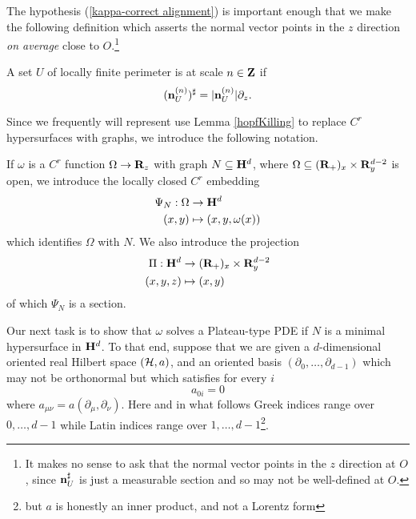 The hypothesis (\ref{kappa-correct alignment}) is important enough that we make the following definition which asserts the normal vector points in the $z$ direction \emph{on average} close to $O$.\footnote{It makes no sense to ask that the normal vector points in the $z$ direction at $O$, since $\mathbf n^\sharp_U$ is just a measurable section and so may not be well-defined at $O$.}

\begin{definition}
A set $U$ of locally finite perimeter is  at scale $n \in \mathbf{Z}$ if 
$$(\mathbf n^{(n)}_U)^\sharp = |\mathbf n^{(n)}_U|\partial_z.$$
\end{definition}

Since we frequently will represent use Lemma \ref{hopfKilling} to replace $C^r$ hypersurfaces with graphs, we introduce the following notation.

\begin{notation}\label{hyperbolic line bundle}
    If $\omega$ is a $C^r$ function $\Omega \to \mathbf{R}_z$ with graph $N \subseteq \mathbf H^d$, where $\Omega \subseteq (\mathbf{R}_+)_x \times \mathbf{R}^{d - 2}_y$ is open, we introduce the locally closed $C^r$ embedding
    \begin{align*}
        \Psi_N: \Omega &\to \mathbf H^d \\
        (x, y) &\mapsto (x, y, \omega(x))
    \end{align*}
    which identifies $\Omega$ with $N$.
    We also introduce the projection
    \begin{align*}
        \Pi: \mathbf H^d &\to (\mathbf{R}_+)_x \times \mathbf{R}^{d - 2}_y\\
        (x, y, z) &\mapsto (x, y)
    \end{align*}
    of which $\Psi_N$ is a section.
\end{notation}

Our next task is to show that $\omega$ solves a Plateau-type PDE if $N$ is a minimal hypersurface in $\mathbf H^d$.
To that end, suppose that we are given a $d$-dimensional oriented real Hilbert space $(\mathcal H, a)$, and an oriented basis $(\partial_0, \dots, \partial_{d - 1})$ which may not be orthonormal but which satisfies for every $i$
\begin{equation}\label{0th coordinate orthogonal}
a_{0i} = 0
\end{equation}
where $a_{\mu\nu} = a(\partial_\mu, \partial_\nu)$.
Here and in what follows Greek indices range over $0, \dots, d - 1$ while Latin indices range over $1, \dots, d - 1$\footnote{but $a$ is honestly an inner product, and not a Lorentz form}.

